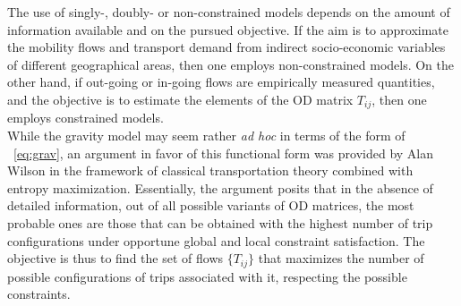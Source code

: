 The use of singly-, doubly- or non-constrained models depends on the amount of information available and on the pursued objective. If the aim is to approximate the mobility flows and  transport demand from indirect socio-economic variables of different geographical areas, then one employs non-constrained models. On the other hand, if out-going or in-going flows are empirically measured quantities,  and the objective is to estimate the elements of the OD matrix $T_{ij}$, then one employs constrained models.\\

While the gravity model may seem rather \emph{ad hoc} in terms of the form of \equationname~\eqref{eq:grav}, an argument in favor of this functional form was provided by Alan Wilson \cite{wilson_1970_entropy} in the framework of classical transportation theory combined with entropy maximization. Essentially, the argument posits that in the absence of detailed information, out of all possible variants of OD matrices, the most probable ones are those that can be obtained with the highest number of trip configurations under opportune global and local constraint satisfaction. The objective is thus to find the set of flows $\{T_{ij}\}$ that maximizes the number of possible configurations of trips associated with it, respecting the possible constraints. 

